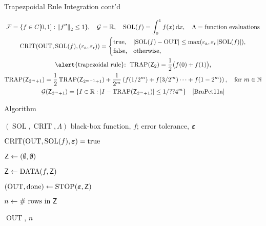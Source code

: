 \documentclass[10pt,compress,xcolor={usenames,dvipsnames},aspectratio=169]{beamer}
\DeclareMathOperator{\TRAP}{TRAP}
\DeclareMathOperator{\STOP}{STOP}
\DeclareMathOperator{\DATA}{DATA}
\DeclareMathOperator{\SOL}{SOL}
\DeclareMathOperator{\OUT}{OUT}
\DeclareMathOperator{\CRIT}{CRIT}
\newcommand{\ttrue}{\text{true}}
\newcommand{\tfalse}{\text{false}}
\newcommand{\tolabs}{\varepsilon_{\text{a}}}
\newcommand{\tolrel}{\varepsilon_{\text{r}}}
\begin{document}
\begin{frame}{Trapezpoidal Rule Integration cont'd}

\vspace{-2ex}
\begin{gather*}
	\cf = \{f \in C[0,1] : \norm[2]{f''} \le 1\}, \quad 
	\cg  = \reals,  \quad
	\SOL(f) = \int_0^1 f(x) \, \dif x, \quad   \Lambda = \text{function evaluations} \\
	\CRIT(\OUT, \SOL(f),(\tolabs, \tolrel))  = \begin{cases} \ttrue, & \abs{\SOL(f) - \OUT} \le \max(\tolabs,\tolrel \abs{\SOL(f)}), \\
		\tfalse, & \text{otherwise},
		\end{cases} \\
		\text{\alert{trapezoidal rule}: } 
		\TRAP(\mZ_2) = \frac 1{2} \bigl( f(0) + f(1) \bigr), \\  \TRAP(\mZ_{2^m+1}) = \frac {1}{2}\TRAP(\mZ_{2^{m-1}+1}) + \frac 1{2^m} \left( f(1/2^m) + f(3/2^m) \cdots + f(1 - 2^m) \right) , \quad \text{for } m \in \naturals \\
		\cg(\mZ_{2^m+1}) = \{I \in \reals : \abs{I - \TRAP(\mZ_{2^m+1})} \le 1/??4^m\} \quad \text{\cite[(7.??)]{BraPet11a}}
\end{gather*}


\end{frame}



\begin{frame}{Algorithm}
	
\vspace{-2ex}
\begin{algorithm}[H]
	\renewcommand{\thealgorithm}{}
	\caption{General Algorithm Pattern}
	\begin{algorithmic}
		\PROB $(\SOL, \CRIT,\Lambda)$
		\INPUT black-box function, $f$;  error tolerance, $\boldsymbol{\varepsilon}$
		
		\Ensure  $\CRIT(\OUT,\SOL(f),\veps) = \ttrue$
		
		\State $\mathsf{Z} \leftarrow (\emptyset, \emptyset)$
				
		\Repeat 
		
		\State $\mZ \leftarrow \DATA(f,\mZ)$

		\State $(\OUT,\text{done}) \leftarrow \STOP(\veps,\mZ)$
				
		\Until{$\text{done} = \ttrue$}
		
		\State $n  \leftarrow \text{\# rows in } \mathsf{Z}$
		
		\RETURN $\OUT$, $n$
	\end{algorithmic}
\end{algorithm}	
\end{frame}

\printbibliography
\end{document}
